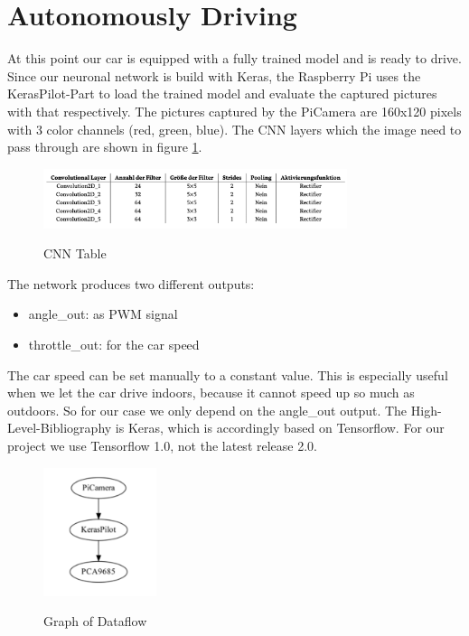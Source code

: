 \documentclass[journal]{IEEEtran}
\begin{document}
\section{Autonomously Driving}
\label{sec:AutonomouslyDriving}
At this point our car is equipped with a fully trained model and is ready to drive. Since our neuronal network is build with Keras, the Raspberry Pi uses the KerasPilot-Part to load the trained model and evaluate the captured pictures with that respectively. The pictures captured by the PiCamera are 160x120 pixels with 3 color channels (red, green, blue). The CNN layers which the image need to pass through are shown in figure \ref{cnn_table}.

\begin{figure}
  \begin{center}
  \includegraphics[width=3.5in]{photo/cnn_table.png}\\
  \caption{CNN Table}\label{cnn_table}
  \end{center}
\end{figure}

The network produces two different outputs:

\begin{itemize}
\item angle\_out: as PWM signal
\item throttle\_out: for the car speed
\end{itemize}

The car speed can be set manually to a constant value. This is especially useful when we let the car drive indoors, because it cannot speed up so much as outdoors. So for our case we only depend on the angle\_out output. The High-Level-Bibliography is Keras, which is accordingly based on Tensorflow. For our project we use Tensorflow 1.0, not the latest release 2.0. \\

\begin{figure}
  \begin{center}
  \includegraphics[width=1.3in]{photo/autonom.png}\\
  \caption{Graph of Dataflow}\label{autonom}
  \end{center}
\end{figure}
\end{document}

